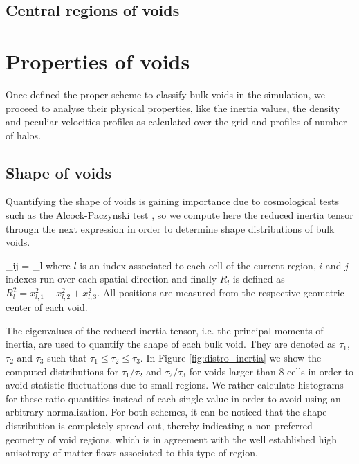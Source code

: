 \documentclass[a4,useAMS,usenatbib,usegraphicx]{latex/mn2e}
\begin{document}
\subsection{Central regions of voids}
\label{subsec:central_voids}


\section{Properties of voids}
\label{sec:properties}


Once defined the proper scheme to classify bulk voids in the simulation,
we proceed to analyse their physical properties, like the inertia values,
the density and peculiar velocities profiles as calculated over the grid 
and profiles of number of halos.


\subsection{Shape of voids}
\label{subsec:shape_voids}


Quantifying the shape of voids is gaining importance due to cosmological 
tests such as the Alcock-Paczynski test \SRKED{[Sutter, et.al (2012)]}, so 
we compute here the reduced inertia tensor through the next expression in 
order to determine shape distributions of bulk voids.


{ \tau_{ij} = \sum_l  }
where $l$ is an index associated to each cell of the current region, 
$i$ and $j$ indexes run over each spatial direction and finally 
$R_l$ is defined as $R_l^2 = x_{l,1}^2 + x_{l,2}^2 + x_{l,3}^2$. All 
positions are measured from the respective geometric center of each void.


The eigenvalues of the reduced inertia tensor, i.e. the principal moments
of inertia, are used to quantify the shape of each bulk void. They are 
denoted as $\tau_1$, $\tau_2$ and $\tau_3$ such that $\tau_1 \leq \tau_2
\leq \tau_3$. In Figure \ref{fig:distro_inertia} we show the computed
distributions for $\tau_1/\tau_2$ and $\tau_2/\tau_3$ for voids larger 
than 8 cells in order to avoid statistic fluctuations due to small regions.
We rather calculate histograms for these ratio quantities instead of each 
single value in order to avoid using an arbitrary normalization. For both 
schemes, it can be noticed that the shape distribution is completely 
spread out, thereby indicating a non-preferred geometry of void regions, 
which is in agreement with the well established high anisotropy of matter 
flows associated to this type of region. 
\end{document}
